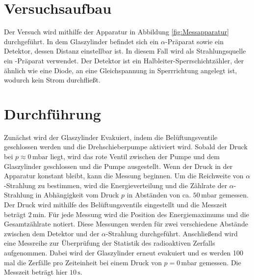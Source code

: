 \section{Versuchsaufbau}
\label{sec:Versuchsaufbau}
Der Versuch wird mithilfe der Apparatur in Abbildung \ref{fig:Messapparatur} durchgeführt. In dem Glaszylinder 
befindet sich ein $\alpha$-Präparat sowie ein Detektor, dessen Distanz einstellbar ist.  In diesem Fall wird als 
Strahlungsquelle ein -Präparat verwendet. Der Detektor ist ein Halbleiter-Sperrschichtzähler, der ähnlich wie 
eine Diode, an eine Gleichspannung in Sperrrichtung angelegt ist, wodurch kein Strom durchfließt.

\section{Durchführung}
\label{sec:Durchführung}
Zunächst wird der Glaszylinder Evakuiert, indem die Belüftungsventile geschlossen werden und die Drehschieberpumpe aktiviert 
wird. Sobald der Druck bei $p \approx 0\,\unit{\milli\bar}$ liegt, wird das rote Ventil zwischen der Pumpe und dem Glaszylinder 
geschlossen und die Pumpe ausgestellt. Wenn der Druck in der Apparatur konstant bleibt, kann die Messung beginnen. Um die Reichweite 
von $\alpha$-Strahlung zu bestimmen, wird die Energieverteilung und die Zählrate der $\alpha$-Strahlung in Abhängigkeit vom Druck $p$ 
in Abständen von ca. $50\,\unit{\milli\bar}$ gemessen. Der Druck wird mithilfe des Belüftungsventils eingestellt und die Messzeit beträgt $2\,\unit{\minute}$. 
Für jede Messung wird die Position des Energiemaximums und die Gesamtzählrate notiert. 
Diese Messungen werden für zwei verschiedene Abstände zwischen dem Detektor und der $\alpha$-Strahlung durchgeführt. Anschließend wird 
eine Messreihe zur Überprüfung der Statistik des radioaktiven Zerfalls aufgenommen. Dabei wird der Glaszylinder erneut evakuiert und es 
werden 100 mal die Zerfälle pro Zeiteinheit bei einem Druck von $p = 0\,\unit{\milli\bar}$ gemessen. Die Messzeit beträgt hier $10\,\unit{\second}$.
